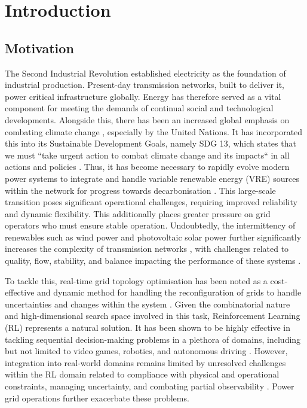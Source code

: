 \chapter{Introduction}
\label{ch:introduction}


\section{Motivation}

The Second Industrial Revolution established electricity as the foundation of industrial production. Present-day transmission networks, built to deliver it, power critical infrastructure globally. Energy has therefore served as a vital component for meeting the demands of continual social and technological developments. Alongside this, there has been an increased global emphasis on combating climate change \cite{Parliamentary_Office_of_Science_and_Technology2024-kk}, especially by the United Nations. It has incorporated this into its Sustainable Development Goals, namely SDG 13, which states that we must ``take urgent action to combat climate change and its impacts`` in all actions and policies \cite{unsdg13}. Thus, it has become necessary to rapidly evolve modern power systems to integrate and handle variable renewable energy (VRE) sources within the network for progress towards decarbonisation \cite{huang2023promoting}. This large-scale transition poses significant operational challenges, requiring improved reliability and dynamic flexibility. This additionally places greater pressure on grid operators who must ensure stable operation. Undoubtedly, the intermittency of renewables such as wind power and photovoltaic solar power further significantly increases the complexity of transmission networks \cite{shadi2025explainable}, with challenges related to quality, flow, stability, and balance impacting the performance of these systems \cite{sinsel2020challenges}. 

To tackle this, real-time grid topology optimisation has been noted as a cost-effective and dynamic method for handling the reconfiguration of grids to handle uncertainties and changes within the system \cite{marzari2025explaining}. Given the combinatorial nature and high-dimensional search space involved in this task, Reinforcement Learning (RL) represents a natural solution. It has been shown to be highly effective in tackling sequential decision-making problems in a plethora of domains, including but not limited to video games, robotics, and autonomous driving \cite{ghasemi2024comprehensive}. However, integration into real-world domains remains limited by unresolved challenges within the RL domain related to compliance with physical and operational constraints, managing uncertainty, and combating partial observability \cite{rashid2024power}. Power grid operations further exacerbate these problems. 

